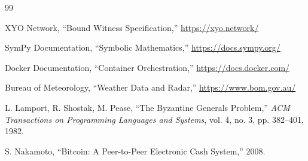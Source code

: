 \documentclass[11pt]{article}
\begin{document}
\begin{thebibliography}{99}

 XYO Network, ``Bound Witness Specification,'' \url{https://xyo.network/}

 SymPy Documentation, ``Symbolic Mathematics,'' \url{https://docs.sympy.org/}

 Docker Documentation, ``Container Orchestration,'' \url{https://docs.docker.com/}

 Bureau of Meteorology, ``Weather Data and Radar,'' \url{https://www.bom.gov.au/}

 L. Lamport, R. Shostak, M. Pease, ``The Byzantine Generals Problem,'' \textit{ACM Transactions on Programming Languages and Systems}, vol. 4, no. 3, pp. 382--401, 1982.

 S. Nakamoto, ``Bitcoin: A Peer-to-Peer Electronic Cash System,'' 2008.

\end{thebibliography}
\end{document}
